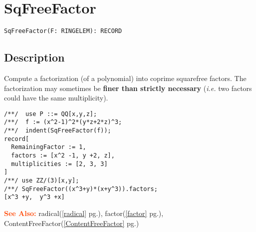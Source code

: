 \documentclass[a4paper]{mybook}
\newenvironment{command}{}{} %
\newcommand\SeeAlso{\par\textcolor{OrangeRed}{\textbf{\large See Also: }}}
\begin{document}
\section{SqFreeFactor}
\label{SqFreeFactor}
\begin{command} %


\begin{Verbatim}[label=syntax, rulecolor=\color{MidnightBlue},
frame=single]
SqFreeFactor(F: RINGELEM): RECORD
\end{Verbatim}


\subsection*{Description}

Compute a factorization (of a polynomial) into coprime squarefree factors.
The factorization may sometimes be \textbf{finer than strictly necessary} (\textit{i.e.} two
factors could have the same multiplicity).
\begin{Verbatim}[label=example, rulecolor=\color{PineGreen}, frame=single]
/**/  use P ::= QQ[x,y,z];
/**/  f := (x^2-1)^2*(y*z+2*z)^3;
/**/  indent(SqFreeFactor(f));
record[
  RemainingFactor := 1,
  factors := [x^2 -1, y +2, z],
  multiplicities := [2, 3, 3]
]
/**/ use ZZ/(3)[x,y];
/**/ SqFreeFactor((x^3+y)*(x+y^3)).factors;
[x^3 +y,  y^3 +x]
\end{Verbatim}


\SeeAlso %
  radical(\ref{radical} pg.\pageref{radical}), 
    factor(\ref{factor} pg.\pageref{factor}), 
    ContentFreeFactor(\ref{ContentFreeFactor} pg.\pageref{ContentFreeFactor})
\end{command} %
\end{document}
